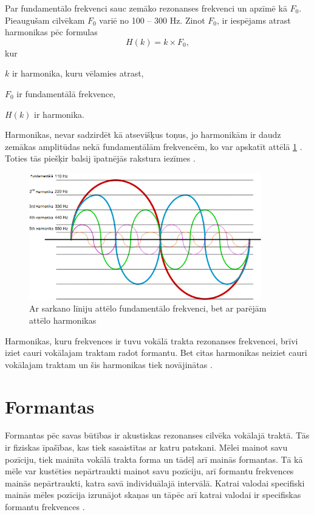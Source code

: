 \documentclass[12pt,paper=A4]{report}
\begin{document}
Par fundamentālo frekvenci sauc zemāko rezonanses frekvenci un apzīmē kā $F_0$. Pieaugušam cilvēkam $F_0$ variē no 100 – 300 Hz.  
Zinot $F_0$, ir iespējams atrast harmonikas pēc formulas 
\begin{equation}
H(k)=k \times F_0,
\end{equation}
kur 

$k$ ir harmonika, kuru vēlamies atrast,

$F_0$ ir fundamentālā frekvence,

$H(k)$ ir harmonika.

Harmonikas, nevar sadzirdēt kā atsevišķus toņus, jo harmonikām ir daudz zemākas amplitūdas nekā fundamentālām frekvencēm, ko var apskatīt attēlā \ref{harmonic}  \cite{https://underlingsosu.wordpress.com/2013/03/08/phonetics-phriday-fundamental-frequency-harmonics-and-formant-frequencies/}. Toties tās piešķir balsij īpatnējās rakstura iezīmes \cite{http://person2.sol.lu.se/SidneyWood/praate/whatform.html}. 

\begin{figure}[H] \centering
\includegraphics[width=0.90\textwidth]{Harmonic} 
\caption{Ar sarkano līniju attēlo fundamentālo frekvenci, bet ar parējām attēlo harmonikas \cite{dtw10}}  \label{harmonic} 
\end{figure}

Harmonikas, kuru frekvences ir tuvu vokālā trakta rezonanses frekvencei, brīvi iziet cauri vokālajam traktam radot formantu. Bet citas harmonikas neiziet cauri vokālajam traktam un šis harmonikas tiek novājinātas \cite{http://person2.sol.lu.se/SidneyWood/praate/whatform.html}.  

\section{Formantas}

Formantas pēc savas būtības ir akustiskas rezonanses cilvēka vokālajā traktā. Tās ir fiziskas īpašības, kas tiek sasaistītas ar katru patskani. Mēlei mainot savu pozīciju, tiek mainīta vokālā trakta forma un tādēļ arī mainās formantas. Tā kā mēle var kustēties nepārtraukti mainot savu pozīciju, arī formantu frekvences mainās nepārtraukti, katra savā individuālajā intervālā. Katrai valodai specifiski mainās mēles pozīcija izrunājot skaņas un tāpēc arī katrai valodai ir specifiskas formantu frekvences \cite{voice}.
\end{document}
